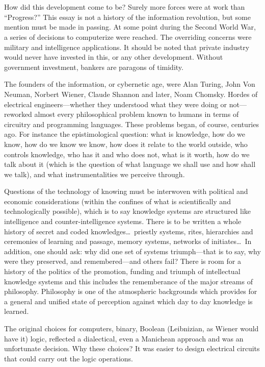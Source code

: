 \chapter{}

How did this development come to be? Surely more forces were at work than \enquote{Progress?} This
essay is not a history of the information revolution, but some mention must be made in passing. At
some point during the Second World War, a series of decisions to computerize were reached. The
overriding concerns were military and intelligence applications. It should be noted that private
industry would never have invested in this, or any other development. Without government investment,
bankers are paragons of timidity. 

The founders of the information, or cybernetic age, were Alan Turing, John Von Neuman, Norbert
Wiener, Claude Shannon and later, Noam Chomsky. Hordes of electrical engineers---whether they
understood what they were doing or not---reworked almost every philosophical problem known to
humans in terms of circuitry and programming languages. These problems began, of course, centuries
ago. For instance the epistimological question: what is knowledge, how do we know, how do we know we
know, how does it relate to the world outside, who controls knowledge, who has it and who does not,
what is it worth, how do we talk about it (which is the question of what language we shall use and
how shall we talk), and what instrumentalities we perceive through. 

Questions of the technology of knowing must be interwoven with political and economic considerations
(within the confines of what is scientifically and technologically possible), which is to say
knowledge systems are structured like intelligence and counter-intelligence systems. There is to be
written a whole history of secret and coded knowledges\ldots\ priestly systems, rites, hierarchies and
ceremonies of learning and passage, memory systems, networks of initiates\ldots\ In addition, one should
ask: why did one set of systems triumph---that is to say, why were they preserved, and
remembered---and others fail? There is room for a history of the politics of the promotion, funding
and triumph of intellectual knowledge systems and this includes the rememberance of the major
streams of philosophy. Philosophy is one of the atmospheric backgrounds which provides for a general
and unified state of perception against which day to day knowledge is learned. 

The original choices for computers, binary, Boolean (Leibnizian, as Wiener would have it) logic,
reflected a dialectical, even a Manichean approach and was an unfortunate decision. Why these
choices? It was easier to design electrical circuits that could carry out the logic operations. 

